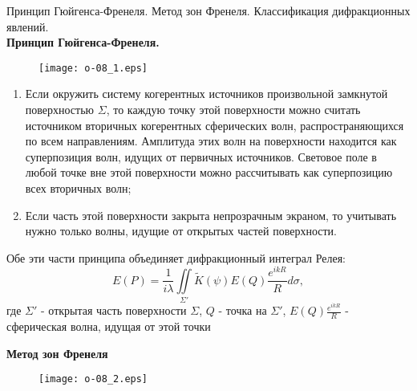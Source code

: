 \documentclass[__main__.tex]{subfiles}
\begin{document}
Принцип Гюйгенса-Френеля. Метод зон Френеля. Классификация дифракционных явлений.\\ 

\textbf{Принцип Гюйгенса-Френеля. }\\

\begin{figure}[h]
	\begin{center}
		\texttt{[image: o-08\_1.eps]}
	\end{center}
\end{figure}
\begin{enumerate}
\item
Если окружить систему когерентных источников произвольной замкнутой поверхностью $\Sigma$, то каждую точку этой поверхности можно считать источником вторичных когерентных сферических волн, распространяющихся по всем направлениям. Амплитуда этих волн на поверхности находится как суперпозиция волн, идущих от первичных источников. Световое поле в любой точке вне этой поверхности можно рассчитывать как суперпозицию всех вторичных волн;
\item
Если часть этой поверхности закрыта непрозрачным экраном, то учитывать нужно только волны, идущие от открытых частей поверхности.
\end{enumerate}
Обе эти части принципа объединяет дифракционный интеграл Релея:
$$E(P) = \frac{1}{i\lambda}\iint\limits_{\Sigma'} \widetilde K(\psi) E(Q)\frac{e^{ikR}}{R}d\sigma,$$
где $\Sigma'$ - открытая часть поверхности $\Sigma$, $Q$ - точка на $\Sigma'$, $E(Q)\frac{e^{ikR}}{R}$ - сферическая волна, идущая от этой точки 


\textbf{Метод зон Френеля}\\

\begin{figure}[h]
	\begin{center}
		\texttt{[image: o-08\_2.eps]}
	\end{center}
\end{figure}
\end{document}
